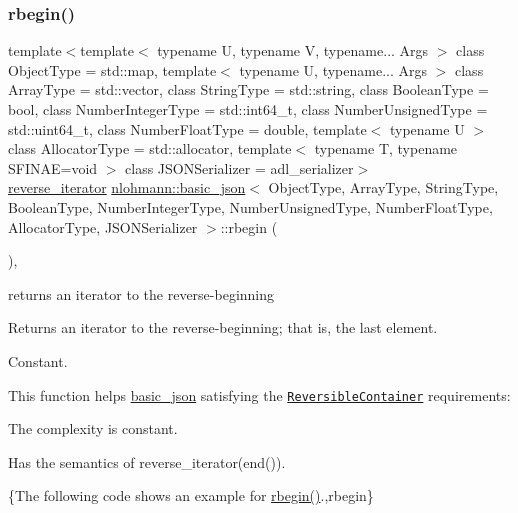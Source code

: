 \subsubsection{\texorpdfstring{rbegin()}{rbegin()}\hspace{0.1cm}{\footnotesize\ttfamily [1/2]}}
{\footnotesize\ttfamily template$<$template$<$ typename U, typename V, typename... Args $>$ class Object\+Type = std\+::map, template$<$ typename U, typename... Args $>$ class Array\+Type = std\+::vector, class String\+Type  = std\+::string, class Boolean\+Type  = bool, class Number\+Integer\+Type  = std\+::int64\+\_\+t, class Number\+Unsigned\+Type  = std\+::uint64\+\_\+t, class Number\+Float\+Type  = double, template$<$ typename U $>$ class Allocator\+Type = std\+::allocator, template$<$ typename T, typename S\+F\+I\+N\+A\+E=void $>$ class J\+S\+O\+N\+Serializer = adl\+\_\+serializer$>$ \\
\mbox{\hyperlink{classnlohmann_1_1basic__json_ac223d5560c2b05a208c88de67376c5f2}{reverse\+\_\+iterator}} \mbox{\hyperlink{classnlohmann_1_1basic__json}{nlohmann\+::basic\+\_\+json}}$<$ Object\+Type, Array\+Type, String\+Type, Boolean\+Type, Number\+Integer\+Type, Number\+Unsigned\+Type, Number\+Float\+Type, Allocator\+Type, J\+S\+O\+N\+Serializer $>$\+::rbegin (\begin{DoxyParamCaption}{ }\end{DoxyParamCaption})\hspace{0.3cm}{\ttfamily [inline]}, {\ttfamily [noexcept]}}



returns an iterator to the reverse-\/beginning 

Returns an iterator to the reverse-\/beginning; that is, the last element.

  Constant.

This function helps {\ttfamily \mbox{\hyperlink{classnlohmann_1_1basic__json}{basic\+\_\+json}}} satisfying the \href{https://en.cppreference.com/w/cpp/named_req/ReversibleContainer}{\tt Reversible\+Container} requirements\+:
\begin{DoxyItemize}
\item The complexity is constant.
\item Has the semantics of {\ttfamily reverse\+\_\+iterator(end())}.
\end{DoxyItemize}

\{The following code shows an example for {\ttfamily \mbox{\hyperlink{classnlohmann_1_1basic__json_a1ef93e2006dbe52667294f5ef38b0b10}{rbegin()}}}.,rbegin\}

